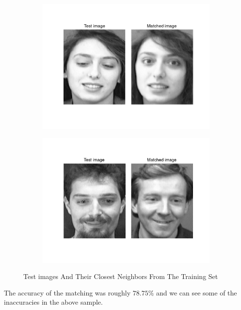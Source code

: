\begin{homeworkProblem}
\begin{figure}[H]
\begin{subfigure}{0.5\textwidth}
      \includegraphics[width=1.\linewidth]{./images/match_5.png}
    \end{subfigure}%
    \begin{subfigure}{0.5\textwidth}
      \centering
      \includegraphics[width=1.\linewidth]{./images/match_6.png}
    \end{subfigure}
    \caption{Test images And Their Closest Neighbors From The Training Set}
    \label{fig:cln}
  \end{figure}

  The accuracy of the matching was roughly $78.75 \%$ and we can see some of the
  inaccuracies in the above sample.

\end{homeworkProblem}

